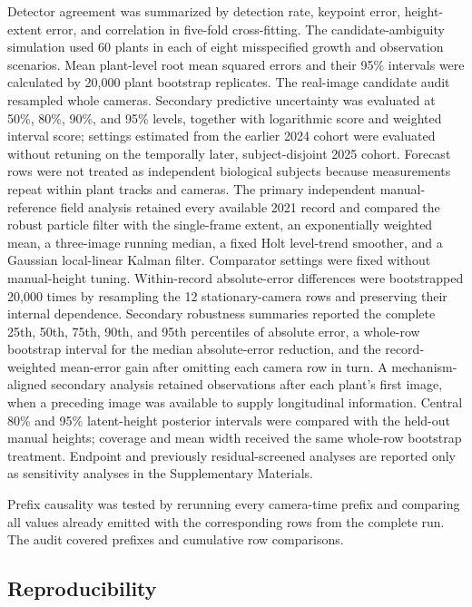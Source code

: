 \documentclass[12pt,letterpaper]{article}
\begin{document}
Detector agreement was summarized by detection rate, keypoint error, height-extent error, and correlation in five-fold cross-fitting. The candidate-ambiguity simulation used 60 plants in each of eight misspecified growth and observation scenarios. Mean plant-level root mean squared errors and their 95\% intervals were calculated by 20,000 plant bootstrap replicates. The real-image candidate audit resampled whole cameras. Secondary predictive uncertainty was evaluated at 50\%, 80\%, 90\%, and 95\% levels, together with logarithmic score and weighted interval score; settings estimated from the earlier 2024 cohort were evaluated without retuning on the temporally later, subject-disjoint 2025 cohort. Forecast rows were not treated as independent biological subjects because measurements repeat within plant tracks and cameras. The primary independent manual-reference field analysis retained every available 2021 record and compared the robust particle filter with the single-frame extent, an exponentially weighted mean, a three-image running median, a fixed Holt level-trend smoother, and a Gaussian local-linear Kalman filter. Comparator settings were fixed without manual-height tuning. Within-record absolute-error differences were bootstrapped 20,000 times by resampling the 12 stationary-camera rows and preserving their internal dependence. Secondary robustness summaries reported the complete 25th, 50th, 75th, 90th, and 95th percentiles of absolute error, a whole-row bootstrap interval for the median absolute-error reduction, and the record-weighted mean-error gain after omitting each camera row in turn. A mechanism-aligned secondary analysis retained observations after each plant's first image, when a preceding image was available to supply longitudinal information. Central 80\% and 95\% latent-height posterior intervals were compared with the held-out manual heights; coverage and mean width received the same whole-row bootstrap treatment. Endpoint and previously residual-screened analyses are reported only as sensitivity analyses in the Supplementary Materials.

Prefix causality was tested by rerunning every camera-time prefix and comparing all values already emitted with the corresponding rows from the complete run. The audit covered \CausalPrefixes{} prefixes and \CausalRows{} cumulative row comparisons.

\subsection{Reproducibility}
\end{document}
